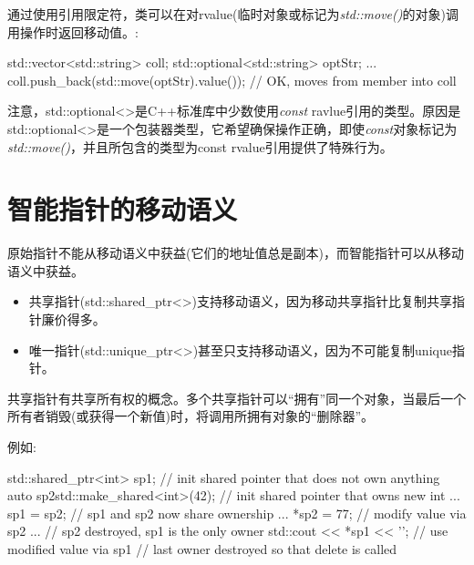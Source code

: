 通过使用引用限定符，类可以在对rvalue(临时对象或标记为\textit{std::move()}的对象)调用操作时返回移动值。:\par

\begin{codebox}[cpp]
std::vector<std::string> coll;
std::optional<std::string> optStr;
...
coll.push_back(std::move(optStr).value()); // OK, moves from member into coll
\end{codebox}

注意，std::\allowbreak{}optional<\allowbreak{}>是C++标准库中少数使用\textit{const} ravlue引用的类型。原因是std::optional<>是一个包装器类型，它希望确保操作正确，即使\textit{const}对象标记为\textit{std::move()}，并且所包含的类型为const rvalue引用提供了特殊行为。\par


\section{智能指针的移动语义}

原始指针不能从移动语义中获益(它们的地址值总是副本)，而智能指针可以从移动语义中获益。\par

\begin{itemize}
  \item 共享指针(std::shared\_ptr<>)支持移动语义，因为移动共享指针比复制共享指针廉价得多。
  \item 唯一指针(std::unique\_ptr<>)甚至只支持移动语义，因为不可能复制unique指针。
\end{itemize}


共享指针有共享所有权的概念。多个共享指针可以“拥有”同一个对象，当最后一个所有者销毁(或获得一个新值)时，将调用所拥有对象的“删除器”。\par

例如:\par

\begin{codebox}[cpp]
{
  std::shared_ptr<int> sp1; // init shared pointer that does not own anything
  {
    auto sp2{std::make_shared<int>(42)}; // init shared pointer that owns new int
    ...
    sp1 = sp2; // sp1 and sp2 now share ownership
    ...
    *sp2 = 77; // modify value via sp2
    ...
  } // sp2 destroyed, sp1 is the only owner
  std::cout << *sp1 << '\n'; // use modified value via sp1
} // last owner destroyed so that delete is called
\end{codebox}

